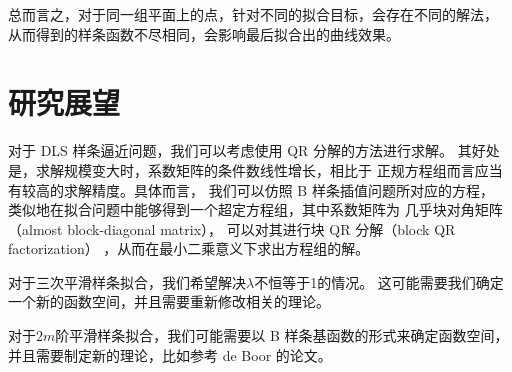 总而言之，对于同一组平面上的点，针对不同的拟合目标，会存在不同的解法，
从而得到的样条函数不尽相同，会影响最后拟合出的曲线效果。

\section{研究展望}
对于 DLS 样条逼近问题，我们可以考虑使用 QR 分解的方法进行求解。
其好处是，求解规模变大时，系数矩阵的条件数线性增长，相比于
正规方程组而言应当有较高的求解精度。具体而言，
我们可以仿照 B 样条插值问题所对应的方程，
类似地在拟合问题中能够得到一个超定方程组，其中系数矩阵为
几乎块对角矩阵（almost block-diagonal matrix），
可以对其进行块 QR 分解（block QR factorization）
\cite{Boor1976SOLVEBLOKAP}，从而在最小二乘意义下求出方程组的解。

对于三次平滑样条拟合，我们希望解决$\lambda$不恒等于1的情况。
这可能需要我们确定一个新的函数空间，并且需要重新修改相关的理论。

对于$2m$阶平滑样条拟合，我们可能需要以 B 样条基函数的形式来确定函数空间，
并且需要制定新的理论，比如参考 de Boor 的论文\cite{Boor2001CALCULATIONOT}。

\newpage
\begingroup
    \printbibliography[title={参考文献}]
\endgroup
